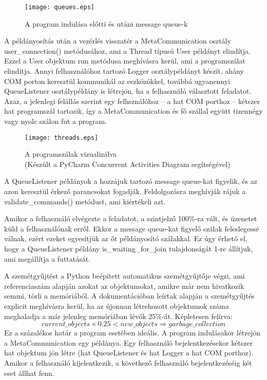 \documentclass[12pt]{report}
\begin{document}
\begin{figure}[h]
    \centering
    \texttt{[image: queues.eps]}
    \caption{A program indulása előtti és utáni message queue-k}
\end{figure}



A példányosítás után a vezérlés visszatér a MetaCommunication osztály user\_connection() metódusához, ami a Thread típusú User példányt elindítja. Ezzel a User objektum run metódusa meghívásra kerül, ami a programszálat elindítja. Annyi felhasználóhoz tartozó Logger osztálypéldányt készít, ahány COM porton keresztül kommunikál az eszközökkel, továbbá ugyanennyi  QueueListener osztálypéldány is létrejön, ha a felhasználó választott feladatot. Azaz, a jelenlegi felállás szerint egy felhsználóhoz -- a hat COM porthoz -- kétszer hat programszál tartozik, így a MetaCommunication és fő szállal együtt tizennégy vagy nyolc szálon fut a program.

\begin{figure}[h]
    \centering
    \texttt{[image: threads.eps]}
    \caption{A programszálak vizualizálva\\(Készült a PyCharm Concurrent Activities Diagram segítségével)}
\end{figure}

A QueueListener példányok a hozzájuk tartozó message queue-kat figyelik, és az azon keresztül érkező parancsokat fogadják. Feldolgozásra meghívják rájuk a validate\_commands() metódust, ami kiértékeli azt.


Amikor a felhasználó elvégezte a feladatot, a szintjelző 100\%-ra vált, és üzenetet küld a felhasználónak erről.
Ekkor a message queue-kat figyelő szálak feleslegessé válnak, ezért ezeket egyesítjük az őt példányosító szálakkal. 
Ez úgy érhető el, hogy a QueueListener példány is\_waiting\_for\_join tulajdonságát 1-re állítjuk, ami megállítja a futtatását.


A szemétgyűjtést a Python beépített automatikus szemétgyűjtője végzi, ami referenciaszám alapján azokat az objektumokat, amikre már nem hivatkozik semmi, törli a memóriából.
A dokumentációban leírtak alapján a szemétgyűjtés explicit meghívásra kerül, ha az újonnan létrehozott objektumok száma meghaladja a már jelenleg memóriában lévők 25\%-át.
Képletesen felírva:
\begin{equation}
    current\_objects \times 0.25 < new\_objects \Rightarrow garbage\_collection
\end{equation}
Ez a százalékos határ a program esetében ideális. A program indulásakor létrejön a MetaCommunication egy példánya.
Egy felhasználó bejelentkezésekor kétszer hat objektum jön létre (hat QueueListener és hat Logger a hat COM porthoz).
Amikor a felhasználó kijelentkezik, a következő felhasználó bejelentkezéséig két eset állhat fenn.
\end{document}

